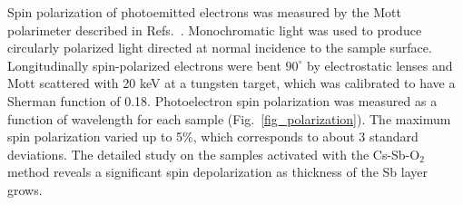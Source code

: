 Spin polarization of photoemitted electrons was measured by the Mott polarimeter described in Refs.~\cite{Mulhollan_SLAC,bae2018_RuggedSpinpolarizedElectron}.
Monochromatic light was used to produce circularly polarized light directed at normal incidence to the sample surface.
Longitudinally spin-polarized electrons were bent $90^\circ$ by electrostatic lenses and Mott scattered with 20 keV at a tungsten target, which was calibrated to have a Sherman function of 0.18.\cite{Mulhollan_SLAC,bae2018_RuggedSpinpolarizedElectron} 
Photoelectron spin polarization was measured as a function of wavelength for each sample (Fig.~\ref{fig_polarization}). The maximum spin polarization varied up to 5\%, which corresponds to about 3 standard deviations.
The detailed study\cite{cultrera2020_LongLifetimePolarized} on the samples activated with the Cs-Sb-O$_2$ method reveals a significant spin depolarization as thickness of the Sb layer grows.
 
 
